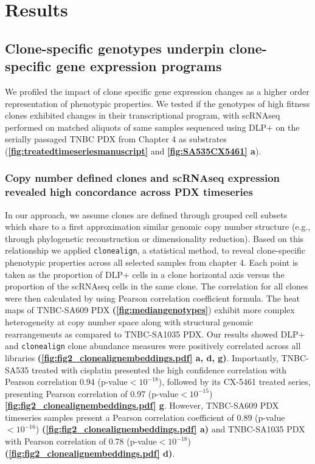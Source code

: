 
\section{Results}

\subsection{Clone-specific genotypes underpin clone-specific gene expression programs}
We profiled the impact of clone specific gene expression changes as a higher order representation of phenotypic properties. We tested if the genotypes of high fitness clones exhibited changes in their transcriptional program, with scRNAseq performed on matched aliquots of same samples sequenced using DLP+ on the serially passaged TNBC PDX from Chapter 4 as substrates (\textbf{\autoref{fig:treatedtimeseriesmanuscript}} and \textbf{\autoref{fig:SA535CX5461} a}).

\subsubsection{Copy number defined clones and scRNAseq expression revealed high concordance across PDX timeseries}
  In our approach, we assume clones are defined through grouped cell subsets which share to a first approximation similar genomic copy number structure \cite{laks2019clonal}(e.g., through phylogenetic reconstruction or dimensionality reduction). Based on this relationship we applied
  \texttt{clonealign}, a statistical method, \cite{campbell2019clonealign} to reveal clone-specific phenotypic properties across all selected samples from chapter 4.
  Each point is taken as the proportion of DLP+ cells in a clone horizontal axis versus the proportion of the scRNAseq cells in the same clone. The  correlation for all clones were then calculated by using Pearson correlation coefficient formula. The heat maps of TNBC-SA609 PDX \textbf{(\autoref{fig:mediangenotypes}}) exhibit more complex heterogeneity at copy number space along with structural genomic rearrangements as compared to TNBC-SA1035 PDX. Our results showed DLP+ and \texttt{clonealign} clone abundance measures were positively correlated across all libraries \textbf{(\autoref{fig:fig2_clonealignembeddings.pdf} a, d, g)}. Importantly, TNBC-SA535 treated with cisplatin presented the high confidence correlation with Pearson correlation 0.94 (p-value$< 10^{-18}$), followed by its CX-5461 treated series, presenting Pearson correlation of 0.97 (p-value$< 10^{-15}$) \textbf{\autoref{fig:fig2_clonealignembeddings.pdf} g}. However, TNBC-SA609 PDX timeseries samples present a Pearson correlation coefficient of 0.89 (p-value $< 10^{-16}$) \textbf{(\autoref{fig:fig2_clonealignembeddings.pdf} a)} and TNBC-SA1035 PDX with Pearson correlation of 0.78 (p-value$< 10^{-18}$) \textbf{(\autoref{fig:fig2_clonealignembeddings.pdf} d)}.
  
